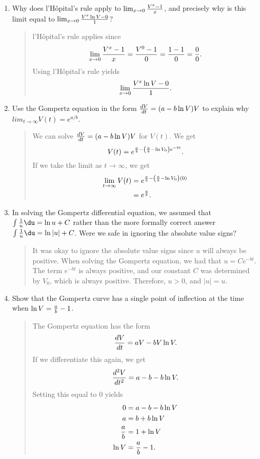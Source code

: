 \documentclass{hw}
\begin{document}
\begin{enumerate}
\item Why does l'H\^opital's rule apply to $\lim_{x\to 0}{V^{x} - 1 \over x}$, and precisely why is this
limit equal to $\lim_{x\to0}{V^{x}\ln{V} - 0\over 1}$?
\begin{quote}
l'H\^opital's rule applies since
\[
\lim_{x\to 0}{V^{x} - 1 \over x} = {V^{0} - 1\over0} = {1-1\over0} = {0\over0}.
\]
Using l'H\^opital's rule yields
\[
\lim_{x\to0}{V^{x}\ln{V} - 0\over 1}.
\]
\end{quote}

\item Use the Gompertz equation in the form ${dV\over dt} = (a-b\ln{V})V$ to explain why
$lim_{t\to\infty}V(t) = e^{a/b}$.
\begin{quote}
We can solve ${dV\over dt} = (a-b\ln{V})V$ for $V(t)$. We get
\[
V(t) = e^{{a\over b}-\left({a\over b}-\ln{V_{0}}\right)e^{-bt}}.
\]
If we take the limit as $t\to\infty$, we get
\begin{align*}
\lim_{t\to\infty}V(t) &= e^{{a\over b}-\left({a\over b}-\ln{V_{0}}\right)(0)}\\
&= e^{{a\over b}}.
\end{align*}
\end{quote}

\item In solving the Gompertz differential equation, we assumed that
$\int{1\over u}\du = \ln{u}+C$ rather than the more formally correct answer
$\int{1\over u}\du = \ln{|u|}+C$. Were we safe in ignoring the absolute value signs?
\begin{quote}
It was okay to ignore the absolute value signs since $u$ will always be positive. When solving the Gompertz
equation, we had that $u=Ce^{-bt}$. The term $e^{-bt}$ is always positive, and our constant $C$ was
determined by $V_{0}$, which is always positive. Therefore, $u > 0$, and $|u| = u$.
\end{quote}

\item Show that the Gompertz curve has a single point of inflection at the time when
$\ln{V} = {a\over b} - 1$.
\begin{quote}
The Gompertz equation has the form
\[
{dV\over dt} = aV-bV\ln{V}.
\]
If we differentiate this again, we get
\[
{d^2V\over dt^2} = a-b-b\ln{V}.
\]
Setting this equal to 0 yields
\begin{align*}
0 &= a-b-b\ln{V}\\
a &= b+b\ln{V}\\
{a\over b} &= 1 + \ln{V}\\
\ln{V} &= {a\over b} - 1.
\end{align*}
\end{quote}


\end{enumerate}
\end{document}
